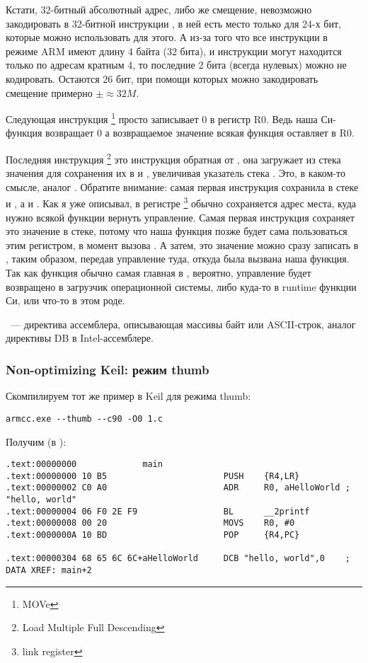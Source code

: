 Кстати, 32-битный абсолютный адрес, либо же смещение, невозможно закодировать в 32-битной инструкции , в ней есть место только для 24-х бит, которые можно использовать для этого. А из-за того что все инструкции в режиме ARM имеют длину 4 байта (32 бита), и инструкции могут находится только по адресам кратным 4, то последние 2 бита (всегда нулевых) можно не кодировать. Остаются 26 бит, при помощи которых можно закодировать смещение примерно $\pm{}\approx{}32M$.

Следующая инструкция \footnote{MOVe} просто записывает 0 в регистр R0. Ведь наша Си-функция
возвращает 0 а возвращаемое значение всякая функция оставляет в R0.

Последняя инструкция \footnote{Load Multiple Full Descending} это инструкция обратная
от , она загружает из стека значения для сохранения их в  и , увеличивая указатель стека . Это, в каком-то смысле, аналог \POP. Обратите внимание: самая первая инструкция  сохранила в стеке  и , а   и . Как я уже описывал, в регистре \footnote{link register} обычно сохраняется адрес места, куда нужно всякой функции вернуть управление. Самая первая инструкция сохраняет это значение в стеке, потому что наша функция позже будет сама пользоваться этим регистром, в момент вызова . А затем, это значение можно сразу записать в , таким образом, передав управление туда, откуда была вызвана наша функция. Так как функция  обычно самая главная в \CCpp, вероятно, управление будет возвращено в загрузчик операционной системы, либо куда-то в runtime функции Си, или что-то в этом роде.

 ~--- директива ассемблера, описывающая массивы байт или ASCII-строк, аналог директивы DB в 
Intel-ассемблере.

\subsubsection{Non-optimizing Keil: режим thumb}

Скомпилируем тот же пример в Keil для режима thumb:

\begin{lstlisting}
armcc.exe --thumb --c90 -O0 1.c 
\end{lstlisting}

Получим (в \IDA):

\begin{lstlisting}
.text:00000000             main
.text:00000000 10 B5                       PUSH    {R4,LR}
.text:00000002 C0 A0                       ADR     R0, aHelloWorld ; "hello, world"
.text:00000004 06 F0 2E F9                 BL      __2printf
.text:00000008 00 20                       MOVS    R0, #0
.text:0000000A 10 BD                       POP     {R4,PC}

.text:00000304 68 65 6C 6C+aHelloWorld     DCB "hello, world",0    ; DATA XREF: main+2
\end{lstlisting}

